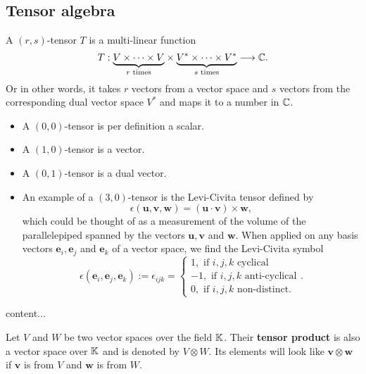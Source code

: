 \subsection{Tensor algebra}

	
	
	\begin{definition}[Tensor]
		A $(r,s)$-tensor $T$ is a multi-linear function
		\[
			T: \underset{r \text{ times}}{\underbrace{V \times \dots \times V}} \times \underset{s \text{ times}}{\underbrace{V^* \times \dots \times V^*}} \longrightarrow \mathbb{C}.
		\]
		Or in other words, it takes $r$ vectors from a vector space and $s$ vectors from the corresponding dual vector space $V^*$ and maps it to a number in $\mathbb{C}$.
	\end{definition}
	
	\begin{example}[Tensors]
		\begin{itemize}
			\itemsep0em 
			\item A $(0,0)$-tensor is per definition a scalar.
			\item A $(1,0)$-tensor is a vector.
			\item A $(0,1)$-tensor is a dual vector.
			\item An example of a $(3,0)$-tensor is the Levi-Civita tensor defined by 
			\[
				\epsilon(\mathbf{u}, \mathbf{v}, \mathbf{w}) = (\mathbf{u} \cdot \mathbf{v}) \times \mathbf{w},
			\]
			which could be thought of as a measurement of the volume of the parallelepiped spanned by the vectors $\mathbf{u},\mathbf{v}$ and $\mathbf{w}$. When applied on any basis vectors $\mathbf{e}_i, \mathbf{e}_j$ and $\mathbf{e}_k$ of a vector space, we find the Levi-Civita symbol
			\[
				\epsilon(\mathbf{e}_i, \mathbf{e}_j, \mathbf{e}_k) := \epsilon_{ijk} = \begin{cases}
					1, \text{ if $i,j,k$ cyclical} \\
					-1, \text{ if $i,j,k$ anti-cyclical} \\
					0, \text{ if $i,j,k$ non-distinct.}
					\end{cases}.
			\]
		\end{itemize}
	\end{example}
	
	\begin{definition}
		content...
	\end{definition}
	
	\begin{definition}\label{def:tensorproduct}
		Let $V$ and $W$ be two vector spaces over the field $\mathbb{K}$. Their \textbf{tensor product} is also a vector space over $\mathbb{K}$ and is denoted by $V \otimes W$. Its elements will look like $\mathbf{v} \otimes \mathbf{w}$ if $\mathbf{v}$ is from $V$ and $\mathbf{w}$ is from $W$. 
	\end{definition}
	
